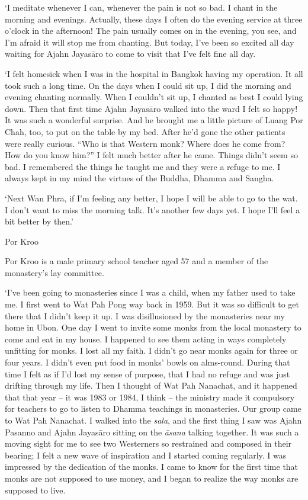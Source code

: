 `I meditate whenever I can, whenever the pain is not so bad. I chant in
the morning and evenings. Actually, these days I often do the evening
service at three o'clock in the afternoon! The pain usually comes on in
the evening, you see, and I'm afraid it will stop me from chanting. But
today, I've been so excited all day waiting for Ajahn Jayasāro to come
to visit that I've felt fine all day. 

`I felt homesick when I was in the hospital in Bangkok having my
operation. It all took such a long time. On the days when I could sit
up, I did the morning and evening chanting normally. When I couldn't sit
up, I chanted as best I could lying down. Then that first time Ajahn
Jayasāro walked into the ward I felt so happy! It was such a wonderful
surprise. And he brought me a little picture of Luang Por Chah, too, to
put on the table by my bed. After he'd gone the other patients were
really curious. ``Who is that Western monk? Where does he come from? How
do you know him?'' I felt much better after he came. Things didn't seem
so bad. I remembered the things he taught me and they were a refuge to
me. I always kept in my mind the virtues of the Buddha, Dhamma and
Sangha. 

`Next Wan Phra, if I'm feeling any better, I hope I will be able to go
to the wat. I don't want to miss the morning talk. It's another few days
yet. I hope I'll feel a bit better by then.'

Por Kroo

Por Kroo is a male primary school teacher aged 57 and a member of the
monastery's lay committee. 

`I've been going to monasteries since I was a child, when my father used
to take me. I first went to Wat Pah Pong way back in 1959. But it was so
difficult to get there that I didn't keep it up. I was disillusioned by
the monasteries near my home in Ubon. One day I went to invite some
monks from the local monastery to come and eat in my house. I happened
to see them acting in ways completely unfitting for monks. I lost all my
faith. I didn't go near monks again for three or four years. I didn't
even put food in monks' bowls on alms-round. During that time I felt as
if I'd lost my sense of purpose, that I had no refuge and was just
drifting through my life. Then I thought of Wat Pah Nanachat, and it
happened that that year -- it was 1983 or 1984, I think -- the
ministry made it compulsory for teachers to go to listen to Dhamma
teachings in monasteries. Our group came to Wat Pah Nanachat. I walked
into the \emph{sala}, and the first thing I saw was Ajahn Pasanno and
Ajahn Jayasāro sitting on the \emph{āsana} talking together. It was such
a moving sight for me to see two Westerners so restrained and composed
in their bearing; I felt a new wave of inspiration and I started coming
regularly. I was impressed by the dedication of the monks. I came to
know for the first time that monks are not supposed to use money, and I
began to realize the way monks are supposed to live. 

